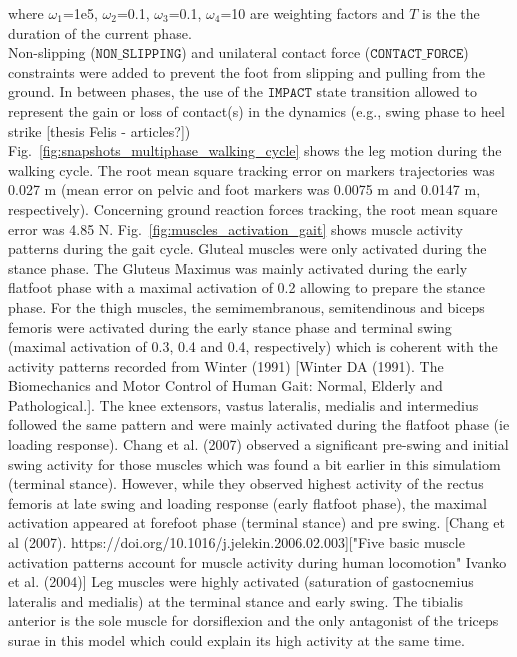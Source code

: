 \noindent where $\omega_1$=1e5, $\omega_2$=0.1, $\omega_3$=0.1, $\omega_4$=10 are  weighting factors and $T$ is the the duration of the current phase.\\

Non-slipping ($\mathtt{NON\_SLIPPING}$) and unilateral contact force ($\mathtt{CONTACT\_FORCE}$) constraints were added to prevent the foot from slipping and pulling from the ground. 
In between phases, the use of the $\mathtt{IMPACT}$ state transition allowed to represent the gain or loss of contact(s) in the dynamics (e.g., swing phase to heel strike [thesis Felis - articles?]) \\

Fig.~\ref{fig:snapshots_multiphase_walking_cycle} shows the leg motion during the walking cycle. 
The root mean square tracking error on markers trajectories was 0.027 m (mean error on pelvic and foot markers was 0.0075 m and 0.0147 m, respectively). 
Concerning ground reaction forces tracking, the root mean square error was 4.85 N.
Fig.~\ref{fig:muscles_activation_gait} shows muscle activity patterns during the gait cycle.
Gluteal muscles were only activated during the stance phase. The Gluteus Maximus was mainly activated during the early flatfoot phase with a maximal activation of 0.2 allowing to prepare the stance phase. 
For the thigh muscles, the semimembranous, semitendinous and biceps femoris were activated during the early stance phase and terminal swing (maximal activation of 0.3, 0.4 and 0.4, respectively) which is coherent with the activity patterns recorded from Winter (1991) [Winter DA (1991). The Biomechanics and Motor Control of Human Gait: Normal, Elderly and Pathological.].  
The knee extensors, vastus lateralis, medialis and intermedius followed the same pattern and were mainly activated during the flatfoot phase (ie loading response). Chang et al. (2007) observed a significant pre-swing and initial swing activity for those muscles which was found a bit earlier in this simulatiom (terminal stance).
However, while they observed highest activity of the rectus femoris at late swing and loading response (early flatfoot phase), the maximal activation appeared at  forefoot phase (terminal stance) and pre swing. [Chang et al (2007). https://doi.org/10.1016/j.jelekin.2006.02.003]["Five basic muscle activation patterns account for muscle activity during human locomotion" Ivanko et al. (2004)] 
Leg muscles were highly activated (saturation of gastocnemius lateralis and medialis) at the terminal stance and early swing. The tibialis anterior is the sole muscle for dorsiflexion and the only antagonist of the triceps surae in this model which could explain its high activity at the same time. 


